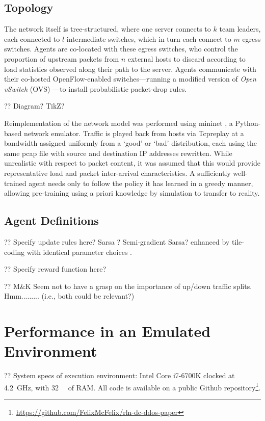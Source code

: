 \documentclass[conference, letterpaper, 10pt, times]{IEEEtran}
\begin{document}
\subsection{Topology}
The network itself is tree-structured, where one server connects to $k$ team leaders, each connected to $l$ intermediate switches, which in turn each connect to $m$ egress switches.
Agents are co-located with these egress switches, who control the proportion of upstream packets from $n$ external hosts to discard according to load statistics observed along their path to the server.
Agents communicate with their co-hosted OpenFlow-enabled switches---running a modified version of \emph{Open vSwitch} (OVS) \cite{open-vswitch}---to install probabilistic packet-drop rules.

?? Diagram? TikZ?

Reimplementation of the network model was performed using mininet \cite{mininet}, a Python-based network emulator.
Traffic is played back from hosts via Tcpreplay at a bandwidth assigned uniformly from a `good' or `bad' distribution, each using the same pcap file with source and destination IP addresses rewritten.
While unrealistic with respect to packet content, it was assumed that this would provide representative load and packet inter-arrival characteristics.
A sufficiently well-trained agent needs only to follow the policy it has learned in a greedy manner, allowing pre-training using a priori knowledge by simulation to transfer to reality.

\subsection{Agent Definitions}

?? Specify update rules here? Sarsa \cite[pp.\ \numrange{129}{131}]{RL2E}? Semi-gradient Sarsa? enhanced by tile-coding with identical parameter choices \cite{DBLP:phd/ethos/Malialis14}.

?? Specify reward function here?

?? M\&K Seem not to have a grasp on the importance of up/down traffic splits. Hmm......... (i.e., both could be relevant?)

\section{Performance in an Emulated Environment}

?? System specs of execution environment: Intel Core i7-6700K clocked at \SI{4.2}{\giga\hertz}, with \SI{32}{\gibi\byte} of RAM. All code is available on a public Github repository\footnote{\url{https://github.com/FelixMcFelix/rln-dc-ddos-paper}}.
\end{document}
